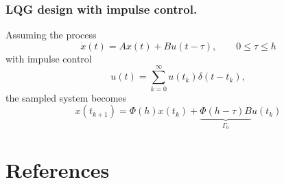 \documentclass[final,twoside]{rapport}  %
\begin{document}
\subsubsection{LQG design with impulse control.}

Assuming the process
\[
\dot x(t) = Ax(t) + Bu(t-\tau), \qquad 0 \leq \tau \leq h
\]
with impulse control
\[
u(t) = \sum_{k=0}^\infty u(t_k) \delta(t-t_k),
\]
the sampled system becomes
\[
x(t_{k+1}) = \Phi(h) x(t_k) + \underbrace{\Phi(h-\tau)B}_{\Gamma_0}u(t_k)
\]



\newpage
\section{References}


\end{document}

